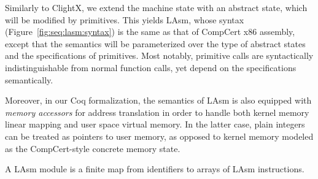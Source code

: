 Similarly to ClightX, we extend the machine state with an abstract
state, which will be modified by primitives. This yields LAsm, whose
syntax (\cf Figure~\ref{fig:seq:lasm:syntax}) is the same as that of CompCert x86 assembly, except that the
semantics will be parameterized over the type of abstract states and
the specifications of primitives.  Most notably, primitive calls are
syntactically indistinguishable from normal function calls, yet depend
on the specifications semantically.

Moreover, in our Coq formalization, the semantics of LAsm is also
equipped with \emph{memory accessors} for address translation in order to handle both
kernel memory linear mapping and user space virtual memory.
In the latter case, plain integers can be treated
as pointers to user memory, as opposed to kernel memory modeled as the
CompCert-style concrete memory state. 

\begin{definition}
A LAsm module is a finite map from identifiers to arrays of LAsm
instructions.
\end{definition}


